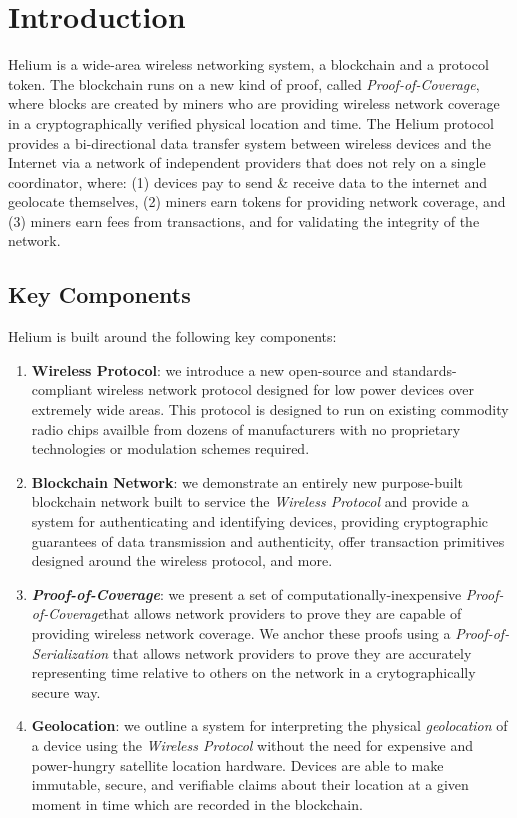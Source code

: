 \documentclass[letterpaper,11pt]{report}
\newcommand{\proofofcoverage}{\textit{Proof-of-Coverage}}
\begin{document}
\newpage

\tableofcontents
\newpage

\section{Introduction}

Helium is a wide-area wireless networking system, a blockchain and a protocol token. The blockchain runs on a new kind of proof, called \proofofcoverage, where blocks are created by miners who are providing wireless network coverage in a cryptographically verified physical location and time. The Helium protocol provides a bi-directional data transfer system between wireless devices and the Internet via a network of independent providers that does not rely on a single coordinator, where: (1) devices pay to send \& receive data to the internet and geolocate themselves, (2) miners earn tokens for providing network coverage, and (3) miners earn fees from transactions, and for validating the integrity of the network.\newline

\subsection{Key Components}

Helium is built around the following key components:

\begin{enumerate}
	\item \textbf{Wireless Protocol}: we introduce a new open-source and standards-compliant wireless network protocol designed for low power devices over extremely wide areas. This protocol is designed to run on existing commodity radio chips availble from dozens of manufacturers with no proprietary technologies or modulation schemes required.
	\item \textbf{Blockchain Network}: we demonstrate an entirely new purpose-built blockchain network built to service the \textit{Wireless Protocol} and provide a system for authenticating and identifying devices, providing cryptographic guarantees of data transmission and authenticity, offer transaction primitives designed around the wireless protocol, and more.	
	\item \textbf{\proofofcoverage}: we present a set of computationally-inexpensive \proofofcoverage that allows network providers to prove they are capable of providing wireless network coverage. We anchor these proofs using a \textit{Proof-of-Serialization} that allows network providers to prove they are accurately representing time relative to others on the network in a crytographically secure way. 	
	\item \textbf{Geolocation}: we outline a system for interpreting the physical \textit{geolocation} of a device using the \textit{Wireless Protocol} without the need for expensive and power-hungry satellite location hardware. Devices are able to make immutable, secure, and verifiable claims about their location at a given moment in time which are recorded in the blockchain.
\end{enumerate}
\end{document}
